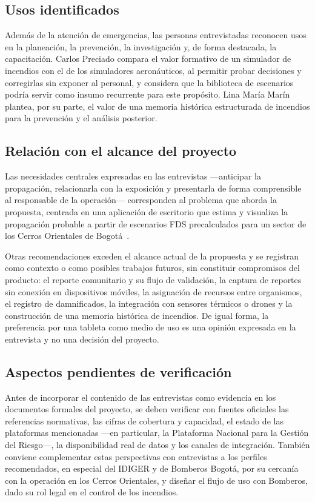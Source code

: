 \subsection{Usos identificados}

Además de la atención de emergencias, las personas entrevistadas reconocen usos en la planeación, la prevención, la investigación y, de forma destacada, la capacitación. Carlos Preciado compara el valor formativo de un simulador de incendios con el de los simuladores aeronáuticos, al permitir probar decisiones y corregirlas sin exponer al personal, y considera que la biblioteca de escenarios podría servir como insumo recurrente para este propósito. Lina María Marín plantea, por su parte, el valor de una memoria histórica estructurada de incendios para la prevención y el análisis posterior.

\subsection{Relación con el alcance del proyecto}

Las necesidades centrales expresadas en las entrevistas ---anticipar la propagación, relacionarla con la exposición y presentarla de forma comprensible al responsable de la operación--- corresponden al problema que aborda la propuesta, centrada en una aplicación de escritorio que estima y visualiza la propagación probable a partir de escenarios FDS precalculados para un sector de los Cerros Orientales de Bogotá~\cite{propuesta2026}.

Otras recomendaciones exceden el alcance actual de la propuesta y se registran como contexto o como posibles trabajos futuros, sin constituir compromisos del producto: el reporte comunitario y su flujo de validación, la captura de reportes sin conexión en dispositivos móviles, la asignación de recursos entre organismos, el registro de damnificados, la integración con sensores térmicos o drones y la construcción de una memoria histórica de incendios. De igual forma, la preferencia por una tableta como medio de uso es una opinión expresada en la entrevista y no una decisión del proyecto.

\subsection{Aspectos pendientes de verificación}

Antes de incorporar el contenido de las entrevistas como evidencia en los documentos formales del proyecto, se deben verificar con fuentes oficiales las referencias normativas, las cifras de cobertura y capacidad, el estado de las plataformas mencionadas ---en particular, la Plataforma Nacional para la Gestión del Riesgo---, la disponibilidad real de datos y los canales de integración. También conviene complementar estas perspectivas con entrevistas a los perfiles recomendados, en especial del IDIGER y de Bomberos Bogotá, por su cercanía con la operación en los Cerros Orientales, y diseñar el flujo de uso con Bomberos, dado su rol legal en el control de los incendios.




